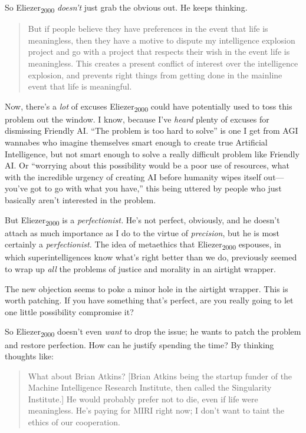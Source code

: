 {
 So Eliezer\textsubscript{2000} \textit{doesn't}
just grab the obvious out. He keeps thinking.}

\begin{quote}
{
 But if people believe they have preferences in the event that life
is meaningless, then they have a motive to dispute my intelligence
explosion project and go with a project that respects their wish in the
event life is meaningless. This creates a present conflict of interest
over the intelligence explosion, and prevents right things from getting
done in the mainline event that life is meaningful.}
\end{quote}

{
 Now, there's a \textit{lot} of excuses
Eliezer\textsubscript{2000} could have potentially used to toss this
problem out the window. I know, because I've
\textit{heard} plenty of excuses for dismissing Friendly AI.
``The problem is too hard to solve''
is one I get from AGI wannabes who imagine themselves smart enough to
create true Artificial Intelligence, but not smart enough to solve a
really difficult problem like Friendly AI. Or
``worrying about this possibility would be a poor use
of resources, what with the incredible urgency of creating AI before
humanity wipes itself out---you've got to go with what
you have,'' this being uttered by people who just
basically aren't interested in the problem.}

{
 But Eliezer\textsubscript{2000} is a \textit{perfectionist.}
He's not perfect, obviously, and he
doesn't attach as much importance as I do to the virtue
of \textit{precision}, but he is most certainly a
\textit{perfectionist.} The idea of metaethics that
Eliezer\textsubscript{2000} espouses, in which superintelligences know
what's right better than we do, previously seemed to
wrap up \textit{all} the problems of justice and morality in an
airtight wrapper.}

{
 The new objection seems to poke a minor hole in the airtight
wrapper. This is worth patching. If you have something
that's perfect, are you really going to let one little
possibility compromise it?}

{
 So Eliezer\textsubscript{2000} doesn't even
\textit{want} to drop the issue; he wants to patch the problem and
restore perfection. How can he justify spending the time? By thinking
thoughts like:}

\begin{quote}
{
 What about Brian Atkins? [Brian Atkins being the startup funder of
the Machine Intelligence Research Institute, then called the
Singularity Institute.] He would probably prefer not to die, even if
life were meaningless. He's paying for MIRI right now;
I don't want to taint the ethics of our cooperation.}
\end{quote}


